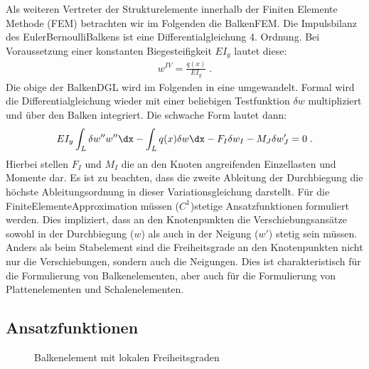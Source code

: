 \documentclass[letterpaper,10pt,german]{jupyterBook}
\let\sphinxpxdimen\pdfpxdimen\else\newdimen\sphinxpxdimen
\begin{document}
\sphinxAtStartPar
Als weiteren Vertreter der Strukturelemente innerhalb der Finiten Elemente Methode (FEM) betrachten wir im Folgenden die Balken\sphinxhyphen{}FEM. Die Impulsbilanz des Euler\sphinxhyphen{}Bernoulli\sphinxhyphen{}Balkens ist eine Differentialgleichung 4. Ordnung. Bei Voraussetzung einer konstanten Biegesteifigkeit \(EI_y\) lautet diese:
\begin{equation}\label{equation:chapters/chapter2/BalkenFEM:balkendglsimple_2}
\begin{split}  w^{IV} =  \frac{q(x)}{E I_y} \; .\end{split}
\end{equation}
\sphinxAtStartPar
Die obige  der Balken\sphinxhyphen{}DGL wird im Folgenden in eine  umgewandelt. Formal wird die Differentialgleichung wieder mit einer beliebigen Testfunktion \(\delta w\) multipliziert und über den Balken integriert. Die schwache Form lautet dann:
\begin{equation}\label{equation:chapters/chapter2/BalkenFEM:weakBalken_01}
\begin{split}  EI_y \int_L \delta w'' w'' \dx - \int_L q(x) \delta w \dx - F_I \delta w_I - M_J \delta w'_J = 0 \; . \end{split}
\end{equation}
\sphinxAtStartPar
Hierbei stellen \(F_I\) und \(M_I\) die an den Knoten angreifenden Einzellasten und Momente dar. Es ist zu beachten, dass die zweite Ableitung der Durchbiegung die höchste Ableitungsordnung in dieser Variationsgleichung darstellt. Für die Finite\sphinxhyphen{}Elemente\sphinxhyphen{}Approximation müssen (\(C^1\))\sphinxhyphen{}stetige Ansatzfunktionen formuliert werden. Dies impliziert, dass an den Knotenpunkten die Verschiebungsansätze sowohl in der Durchbiegung (\(w\)) als auch in der Neigung (\(w'\)) stetig sein müssen. Anders als beim Stabelement sind die Freiheitsgrade an den Knotenpunkten nicht nur die Verschiebungen, sondern auch die Neigungen. Dies ist charakteristisch für die Formulierung von Balkenelementen, aber auch für die Formulierung von Plattenelementen und Schalenelementen.


\subsection{Ansatzfunktionen}
\label{\detokenize{chapters/chapter2/BalkenFEM:ansatzfunktionen}}
\begin{figure}[htbp]
\centering
\capstart

\noindent\sphinxincludegraphics[height=300\sphinxpxdimen]{{Balkenelement}.png}
\caption{Balkenelement mit lokalen Freiheitsgraden}\label{\detokenize{chapters/chapter2/BalkenFEM:balken03-1}}\end{figure}
\end{document}
